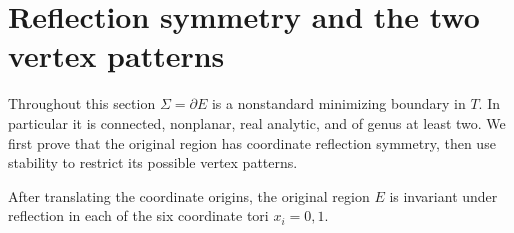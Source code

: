\section{Reflection symmetry and the two vertex patterns}
\label{geo:section}

Throughout this section \(\Sigma=\partial E\) is a nonstandard
minimizing boundary in \(T\). In particular it is connected, nonplanar,
real analytic, and of genus at least two. We first prove that the
original region has coordinate reflection symmetry, then use stability
to restrict its possible vertex patterns.

\begin{lemma}\label{geo:reflection}
After translating the coordinate origins, the original region \(E\)
is invariant under reflection in each of the six coordinate tori
\(x_i=0,1\).
\end{lemma}

